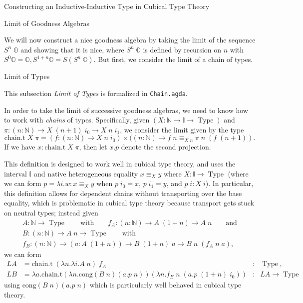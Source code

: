 \documentclass[runningheads]{llncs}
\DeclareMathOperator{\USet}{Type}
\newcommand{\IdA}[3]{{#1}\equiv_{#3}{#2}}
\newcommand{\N}{\mathbb{N}}
\newcommand{\II}{\mathbb{I}}
\newcommand{\bbO}{\mathbb{O}}
\begin{document}
\begin{section}{Constructing an Inductive-Inductive Type in Cubical Type Theory}
\begin{subsection}{Limit of Goodness Algebras}\label{ex-limit-alg}

We will now construct a nice goodness algebra by taking the limit of the sequence $S^n\;\bbO$ and showing that it is nice, where $S^n\;\bbO$ is defined by recursion on $n$ with $S^0\bbO = \bbO, S^{1+n}\bbO = S(S^n\;\bbO)$. But first, we consider the limit of a chain of types.

\begin{subsubsection}{Limit of Types}
    
    This subsection \emph{Limit of Types} is formalized in \texttt{Chain.agda}.
    
    In order to take the limit of successive goodness algebras, we need to know how to work with \emph{chains} of types. Specifically, given $(X : \N \to \II \to \USet)$ and $\pi : (n : \N) \to X\;(n+1)\;i_0 \to X\;n\;i_1$, we consider the limit given by the type \[\text{chain.t}\;X\;\pi = (f : (n : \N) \to X\;n\;i_0)\times((n : \N) \to \IdA{f\;n}{\pi\;n\;(f\;(n+1))}{X\;n}.\] If we have $x : \text{chain.t}\;X\;\pi$, then let $x.p$ denote the second projection.
    
    This definition is designed to work well in cubical type theory, and uses the interval $\II$ and native heterogeneous equality $\IdA{x}{y}{X}$ where $X : \II\to \USet$ (where we can form $p = \lambda i.w : \IdA{x}{y}{X}$ when $p\;i_0 = x$, $p\;i_1 = y$, and $p\;i : X\;i$). In particular, this definition allows for dependent chains without transporting over the base equality, which is problematic in cubical type theory because transport gets stuck on neutral types; instead given
    \begin{gather*}A : \N\to \USet\qquad\text{with}\qquad f_A : (n : \N) \to A\;(1+n) \to A\;n\qquad \text{and}\\B : (n : \N) \to A\;n \to \USet\qquad\text{with}\\f_B : (n : \N) \to (a : A\;(1+n)) \to B\;(1+n)\;a \to B\;n\;(f_A\;n\;a),\end{gather*}
    we can form
    \begin{align*}
    \mathit{LA} &= \text{chain.t}\;(\lambda n.\lambda i. A\;n)\;f_A &:& \USet,\\
    \mathit{LB} &= \lambda a.\text{chain.t}(\lambda n.\text{cong}(B\;n)(a.p\;n))(\lambda n. f_B\;n\;(a.p\;(1+n)\;i_0)) &:& \mathit{LA} \to \USet
    \end{align*}
    using $\text{cong}(B\;n)(a.p\;n)$ which is particularly well behaved in cubical type theory.
    

\end{subsubsection}
\end{subsection}
\end{section}
\end{document}
